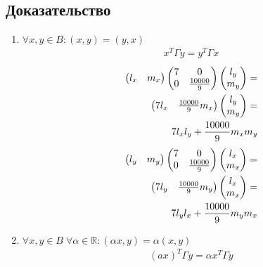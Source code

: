 \subsection*{Доказательство}
\begin{enumerate}
  \item {
        $\forall x, y \in B : (x,y) = (y,x)$
        \begin{align*}
          x^T \Gamma y = y^T \Gamma x
        \end{align*}
        \begin{align*}
          \begin{pmatrix}l_x & m_x\end{pmatrix}
          {\begin{pmatrix} {7}& 0 \\ 0 & {\frac{10000}{9}}\end{pmatrix}}
          \begin{pmatrix}l_y\\m_y\end{pmatrix}= \\
          \begin{pmatrix}{7} l_x & {\frac{10000}{9}} m_x\end{pmatrix}
          \begin{pmatrix}l_y\\m_y\end{pmatrix}= \\
          {7} l_xl_y + {\frac{10000}{9}} m_xm_y
        \end{align*}
        \begin{align*}
          \begin{pmatrix}l_y & m_y\end{pmatrix}
          {\begin{pmatrix} {7}& 0 \\ 0 & {\frac{10000}{9}}\end{pmatrix}}
          \begin{pmatrix}l_x\\m_x\end{pmatrix}= \\
          \begin{pmatrix}{7} l_y & {\frac{10000}{9}} m_y\end{pmatrix}
          \begin{pmatrix}l_x\\m_x\end{pmatrix}= \\
          {7} l_yl_x + {\frac{10000}{9}} m_ym_x
        \end{align*}
        }
  \item {
        $\forall x,y \in B \; \forall \alpha \in \mathbb{R}:(\alpha x, y)= \alpha(x,y)$
        \begin{align*}
          (ax)^T \Gamma y = \alpha x^T \Gamma y
        \end{align*}
        \begin{align*}

\end{align*}}
\end{enumerate}
